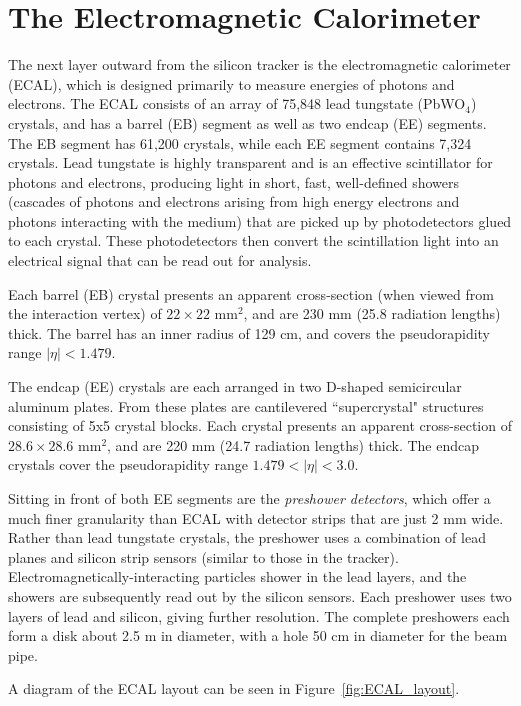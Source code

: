 \section{The Electromagnetic Calorimeter}

The next layer outward from the silicon tracker is the electromagnetic calorimeter (ECAL), which is designed primarily to measure energies of photons and electrons. The ECAL consists of an array of 75,848 lead tungstate (PbWO$_4$) crystals, and has a barrel (EB) segment as well as two endcap (EE) segments. The EB segment has 61,200 crystals, while each EE segment contains 7,324 crystals. Lead tungstate is highly transparent and is an effective scintillator for photons and electrons, producing light in short, fast, well-defined showers (cascades of photons and electrons arising from high energy electrons and photons interacting with the medium) that are picked up by photodetectors glued to each crystal. These photodetectors then convert the scintillation light into an electrical signal that can be read out for analysis. 

Each barrel (EB) crystal presents an apparent cross-section (when viewed from the interaction vertex) of $22\times22$  mm$^2$, and are 230 mm (25.8 radiation lengths) thick. The barrel has an inner radius of 129 cm, and covers the pseudorapidity range $|\eta| < 1.479$\cite{TDR}.

The endcap (EE) crystals are each arranged in two D-shaped semicircular aluminum plates. From these plates are cantilevered ``supercrystal" structures consisting of 5x5 crystal blocks. Each crystal presents an apparent cross-section of $28.6\times28.6$ mm$^2$, and are 220 mm (24.7 radiation lengths) thick. The endcap crystals cover the pseudorapidity range $1.479 < |\eta| < 3.0$.\cite{ECAL}

Sitting in front of both EE segments are the \textit{preshower detectors}, which offer a much finer granularity than ECAL with detector strips that are just 2 mm wide. Rather than lead tungstate crystals, the preshower uses a combination of lead planes and silicon strip sensors (similar to those in the tracker). Electromagnetically-interacting particles shower in the lead layers, and the showers are subsequently read out by the silicon sensors. Each preshower uses two layers of lead and silicon, giving further resolution. The complete preshowers each form a disk about 2.5 m in diameter, with a hole 50 cm in diameter for the beam pipe.

A diagram of the ECAL layout can be seen in Figure~\ref{fig:ECAL_layout}.

